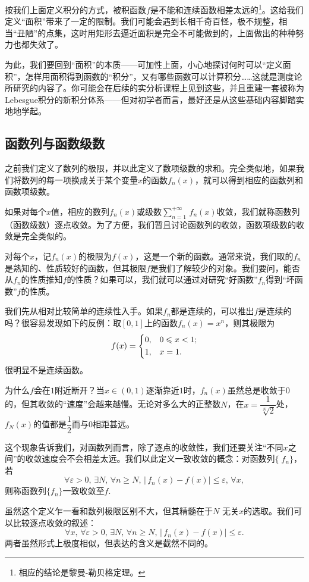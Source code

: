 按我们上面定义积分的方式，被积函数$f$是不能和连续函数相差太远的\footnote{相应的结论是黎曼-勒贝格定理。}。这给我们定义“面积”带来了一定的限制。我们可能会遇到长相千奇百怪，极不规整，相当“丑陋”的点集，这时用矩形去逼近面积是完全不可能做到的，上面做出的种种努力也都失效了。

为此，我们要回到“面积”的本质——可加性上面，小心地探讨何时可以“定义面积”，怎样用面积得到函数的“积分”，又有哪些函数可以计算积分……这就是测度论所研究的内容了。你可能会在后续的实分析课程上见到这些，并且重建一套被称为Lebesgue积分的新积分体系——但对初学者而言，最好还是从这些基础内容脚踏实地地学起。
\subsection{函数列与函数级数}
之前我们定义了数列的极限，并以此定义了数项级数的求和。完全类似地，如果我们将数列的每一项换成关于某个变量$x$的函数$f_n(x)$，就可以得到相应的函数列和函数项级数。

如果对每个$x$值，相应的数列$f_n(x)$或级数$\sum_{n=1}^{+\infty}\,f_n(x)$收敛，我们就称函数列（函数级数）逐点收敛。为了方便，我们暂且讨论函数列的收敛，函数项级数的收敛是完全类似的。

对每个$x$，记$f_n(x)$的极限为$f(x)$，这是一个新的函数。通常来说，我们取的$f_n$是熟知的、性质较好的函数，但其极限$f$是我们了解较少的对象。我们要问，能否从$f_n$的性质推知$f$的性质？如果可以，我们就可以通过对研究“好函数”$f_n$得到“坏函数”$f$的性质。

我们先从相对比较简单的连续性入手。如果$f_n$都是连续的，可以推出$f$是连续的吗？很容易发现如下的反例：取$[0,1]$上的函数$f_n(x)=x^n$，则其极限为
\[f(x)=
    \begin{dcases}
        0, & 0\leqslant  x< 1; \\
        1, & x=1.
    \end{dcases}
\]
很明显不是连续函数。

为什么$f$会在$1$附近断开？当$x\in(0,1)$逐渐靠近$1$时，$f_n(x)$虽然总是收敛于$0$的，但其收敛的“速度”会越来越慢。无论对多么大的正整数$N$，在$x=\dfrac {1}{\sqrt[N]{2}}$处，$f_N(x)$的值都是$\dfrac 12$而与$0$相距甚远。

这个现象告诉我们，对函数列而言，除了逐点的收敛性，我们还要关注“不同$x$之间”的收敛速度会不会相差太远。我们以此定义一致收敛的概念：对函数列$\{\;\!f_n\}$，若
\[\forall \varepsilon>0,\,\exists N,\,\forall n\geqslant  N,\,\bigl|\,f_n(x)-f(x)\bigr|\leqslant  \varepsilon,\,\forall x,\]
则称函数列$\{f_n\}$一致收敛至$f$.

虽然这个定义乍一看和数列极限区别不大，但其精髓在于$N$ 无关$x$的选取。我们可以比较逐点收敛的叙述：
\[\forall x,\,\forall \varepsilon>0,\,\exists N,\,\forall n\geqslant  N,\,|\,f_n(x)-f(x)|\leqslant  \varepsilon.\]
两者虽然形式上极度相似，但表达的含义是截然不同的。

